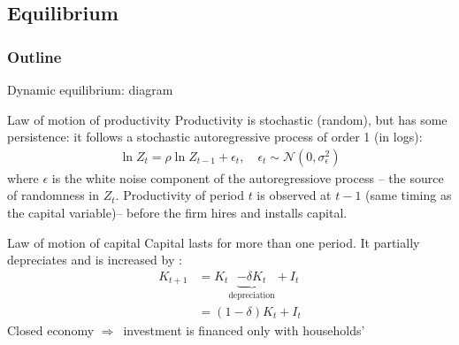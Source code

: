 \documentclass{beamer}
\newcommand{\tb}[1]{{\color{blue}{\textbf{#1}}}}
\newcommand{\rarr}{$\Rightarrow$\ }
\begin{document}
\subsection{Equilibrium}
\begin{frame}
\frametitle{Outline}
\tableofcontents[currentsubsection]
\end{frame}
\begin{frame}{Dynamic equilibrium: diagram}
\begin{center}
\vspace{-5mm}
\begin{figure}[h!]
\end{figure}
\end{center}
\end{frame}


\begin{frame}{Law of motion of productivity}
  Productivity is stochastic (random), but has some persistence: it follows a stochastic autoregressive process of order 1 (in logs):
  \vfill
  \begin{align*}
	\ln Z_t = \rho \ln Z_{t-1} + \epsilon_t, \quad \epsilon_t \sim \mathcal N(0, \sigma^2_\epsilon) 
  \end{align*}
  where $\epsilon$ is the white noise component of the autoregressiove process -- the source of randomness in $Z_t$.
  \vfill
  Productivity of period $t$ is observed at $t-1$ (same timing as the capital variable)-- before the firm hires and installs capital.
\end{frame}

\begin{frame}{Law of motion of capital}
  Capital lasts for more than one period. It partially depreciates and is increased by \tb{investment}: 
  \vfill
  \begin{align*}
	K_{t+1} &= K_{t} \underbrace{- \delta K_t}_{\text{depreciation}} + I_t \\
	&= (1-\delta) K_t + I_t
  \end{align*}
  \vfill
  Closed economy \rarr investment is financed only with households' \tb{savings}
\end{frame}
\end{document}
